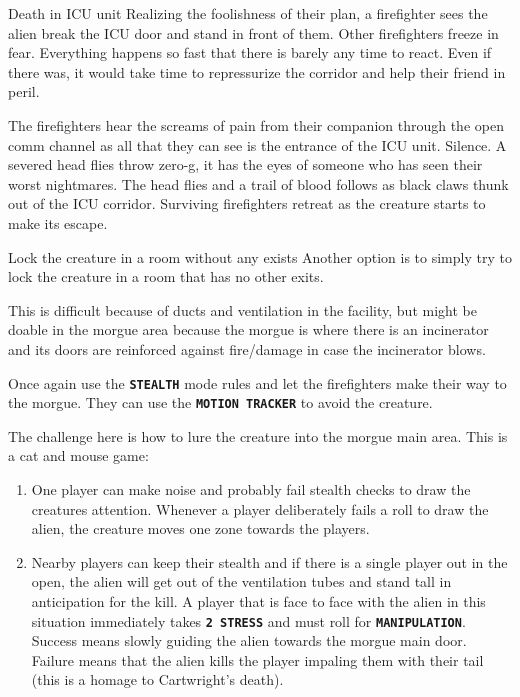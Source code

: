\begin{rpg-warnbox}{Death in ICU unit}
   Realizing the foolishness of their plan, a firefighter sees the alien break the ICU door and stand in front of them. Other firefighters freeze in fear. Everything happens so fast that there is barely any time to react. Even if there was, it would take time to repressurize the corridor and help their friend in peril.

   The firefighters hear the screams of pain from their companion through the open comm channel as all that they can see is the entrance of the ICU unit. Silence. A severed head flies throw zero-g, it has the eyes of someone who has seen their worst nightmares. The head flies and a trail of blood follows as black claws thunk out of the ICU corridor. Surviving firefighters retreat as the creature starts to make its escape.
\end{rpg-warnbox}
 

\newsect

\begin{rpg-commentbox}{Lock the creature in a room without any exists}
   Another option is to simply try to lock the creature in a room that has no other exits. 
   
   This is difficult because of ducts and ventilation in the facility, but might be doable in the morgue area because the morgue is where there is an incinerator and its doors are reinforced against fire/damage in case the incinerator blows. 

   Once again 
   use the \texttt{\textbf{STEALTH}} mode rules and let the firefighters make their way to the morgue.
   They can use the \texttt{\textbf{MOTION TRACKER}} to avoid the creature.

   The challenge here is how to lure the creature into the morgue main area. This is a cat and mouse game:

   \begin{enumerate}
      \item One player can make noise and probably fail stealth checks to draw the creatures attention. Whenever a player deliberately fails a roll to draw the alien, the creature moves one zone towards the players.

      \item Nearby players can keep their stealth and if there is a single player out in the open, the alien will get out of the ventilation tubes and stand tall in anticipation for the kill. A player that is face to face with the alien in this situation immediately takes \texttt{\textbf{2 STRESS}}
      and must roll for \texttt{\textbf{MANIPULATION}}. Success means slowly guiding the alien towards the morgue main door. Failure means that the alien kills the player impaling them with their tail (this is a homage to Cartwright's death).
      
     
   \end{enumerate}
   
\end{rpg-commentbox}

